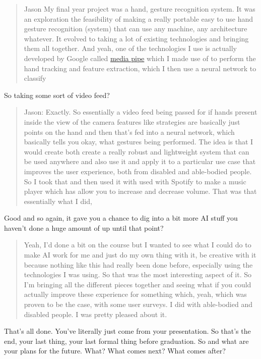 \documentclass[
]{book}
\begin{document}
\begin{quote}
Jason My final year project was a hand, gesture recognition system. It was an exploration the feasibility of making a really portable easy to use hand gesture recognition (system) that can use any machine, any architecture whatever. It evolved to taking a lot of existing technologies and bringing them all together. And yeah, one of the technologies I use is actually developed by Google called \href{https://google.github.io/mediapipe/}{media pipe} which I made use of to perform the hand tracking and feature extraction, which I then use a neural network to classify
\end{quote}

So taking some sort of video feed?

\begin{quote}
Jason: Exactly. So essentially a video feed being passed for if hands present inside the view of the camera features like strategies are basically just points on the hand and then that's fed into a neural network, which basically tells you okay, what gestures being performed. The idea is that I would create both create a really robust and lightweight system that can be used anywhere and also use it and apply it to a particular use case that improves the user experience, both from disabled and able-bodied people. So I took that and then used it with used with Spotify to make a music player which has allow you to increase and decrease volume. That was that essentially what I did,
\end{quote}

Good and so again, it gave you a chance to dig into a bit more AI stuff you haven't done a huge amount of up until that point?

\begin{quote}
Yeah, I'd done a bit on the course but I wanted to see what I could do to make AI work for me and just do my own thing with it, be creative with it because nothing like this had really been done before, especially using the technologies I was using. So that was the most interesting aspect of it. So I'm bringing all the different pieces together and seeing what if you could actually improve these experience for something which, yeah, which was proven to be the case, with some user surveys. I did with able-bodied and disabled people. I was pretty pleased about it.
\end{quote}

That's all done. You've literally just come from your presentation. So that's the end, your last thing, your last formal thing before graduation. So and what are your plans for the future. What? What comes next? What comes after?
\end{document}
